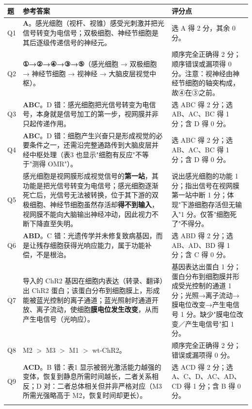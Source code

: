 \documentclass[UTF8,a4paper,11pt]{ctexart}
\begin{document}
\begin{longtable}{@{}p{0.85cm}p{9.7cm}p{4.2cm}@{}}
\toprule
\textbf{题} & \textbf{参考答案} & \textbf{评分点} \\
\midrule
\endhead
Q1 & \textbf{A}。感光细胞（视杆、视锥）感受光刺激并把光信号转变为电信号；双极细胞、神经节细胞是其后逐级传递信号的神经元。 & 选 A 得 2 分，其余 0 分。 \\
\addlinespace
Q2 & \textbf{①→②→④→③→⑤}（感光细胞 → 双极细胞 → 神经节细胞 → 视神经 → 大脑皮层视觉中枢）。 & 顺序完全正确得 2 分；顺序错误或漏项得 0 分。注意：视神经由神经节细胞的轴突构成，故④在③之前。 \\
\addlinespace
Q3 & \textbf{ABC}。D 错：感光细胞把光信号转变为电信号，本身就是信号加工的第一步，视网膜并非只起传递作用。 & 选 ABC 得 2 分；选 AB、AC、BC 得 1 分；含 D 得 0 分。 \\
\addlinespace
Q4 & \textbf{ABC}。D 错：细胞产生兴奋只是形成视觉的必要条件之一，还需沿完整通路传到大脑皮层并经中枢处理（表3 也显示"细胞有反应"不等于"测得 OMR"）。 & 选 ABC 得 2 分；选 AB、AC、BC 得 1 分；含 D 得 0 分。 \\
\addlinespace
Q5 & 感光细胞是视网膜形成视觉信号的\textbf{第一站}，其功能是把光信号转变为电信号；感光细胞逐渐死亡后，光信号无法被转换，位于其下游的双极细胞、神经节细胞虽然存活却\textbf{得不到输入}，视网膜不能向大脑输出神经冲动，因此视力不断下降直至失明。 & 说出感光细胞的功能 1 分；指出信号在视网膜第一站中断 1 分；体现"下游细胞存活但无输入"1 分。仅答"细胞死了"不得分。 \\
\addlinespace
Q6 & \textbf{ABD}。C 错：光遗传学并未修复致病基因，而是让残存细胞获得光响应能力，属于功能补偿，不是根治。 & 选 ABD 得 2 分；选 AB、AD、BD 得 1 分；含 C 得 0 分。 \\
\addlinespace
Q7 & 导入的 ChR2 基因在细胞内表达（转录、翻译）出 ChR2 蛋白；该蛋白分布到细胞膜上，形成能被蓝光控制的离子通道；蓝光照射时通道开放、离子流动，使细胞\textbf{膜电位发生改变}，从而产生电信号（光响应）。 & 基因表达出蛋白 1 分；蛋白分布到细胞膜并形成受光控制的通道 1 分；光照→离子流动→膜电位改变→产生电信号 1 分。缺少"膜电位改变／产生电信号"扣 1 分。 \\
\addlinespace
Q8 & M2 $>$ M3 $>$ M1 $>$ wt-ChR2。 & 顺序完全正确得 2 分；错误或漏项得 0 分。 \\
\addlinespace
Q9 & \textbf{ACD}。B 错：表1 显示被弱光激活能力越强的变体，恢复到静息所需时间越长，二者关系相反；D 对：二者总体相关但并非严格对应（M3 所需光强略高于 M2，恢复时间却更长）。 & 选 ACD 得 2 分；选 A、C、D、AC、AD、CD 得 1 分；含 B 得 0 分。 \\
\addlinespace

\end{longtable}
\end{document}
